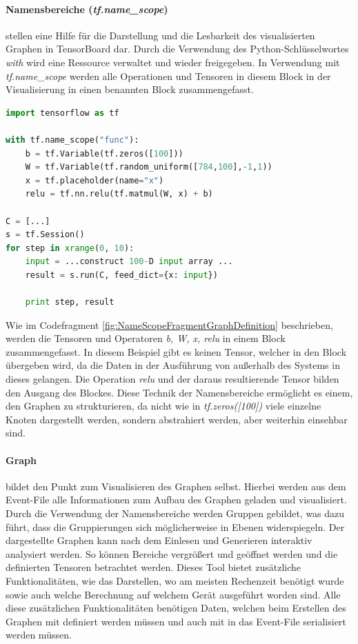 \paragraph{Namensbereiche (\textit{tf.name\_scope})} stellen eine Hilfe für die Darstellung und die Lesbarkeit des visualisierten Graphen in TensorBoard dar. 
Durch die Verwendung des Python-Schlüsselwortes \textit{with} wird eine Ressource verwaltet und wieder freigegeben. 
In Verwendung mit \textit{tf.name\_scope} werden alle Operationen und Tensoren in diesem Block in der Visualisierung in einen benannten Block zusammengefasst.
\begin{lstlisting}[caption={TensorFlow Codefragment zur Namescope Verwendung in Graphen},label=fig:NameScopeFragmentGraphDefinition,captionpos=b,language=Python]
import tensorflow as tf

with tf.name_scope("func"):
	b = tf.Variable(tf.zeros([100])) 
	W = tf.Variable(tf.random_uniform([784,100],-1,1)) 
	x = tf.placeholder(name="x") 
	relu = tf.nn.relu(tf.matmul(W, x) + b) 

C = [...] 
s = tf.Session()
for step in xrange(0, 10):
	input = ...construct 100-D input array ... 
	result = s.run(C, feed_dict={x: input}) 

	print step, result 
\end{lstlisting}
Wie im Codefragment \ref{fig:NameScopeFragmentGraphDefinition} beschrieben, werden die Tensoren und Operatoren \textit{b, W, x, relu} in einem Block zusammengefasst. 
In diesem Beispiel gibt es keinen Tensor, welcher in den Block übergeben wird, da die Daten in der Ausführung von außerhalb des Systems in dieses gelangen. 
Die Operation \textit{relu} und der daraus resultierende Tensor bilden den Ausgang des Blockes. 
Diese Technik der Namensbereiche ermöglicht es einem, den Graphen zu strukturieren, da nicht wie in \textit{tf.zeros([100])} viele einzelne Knoten dargestellt werden, sondern abstrahiert werden, aber weiterhin einsehbar sind.

\paragraph{Graph} bildet den Punkt zum Visualisieren des Graphen selbst. 
Hierbei werden aus dem Event-File alle Informationen zum Aufbau des Graphen geladen und visualisiert. 
Durch die Verwendung der Namensbereiche werden Gruppen gebildet, was dazu führt, dass die Gruppierungen sich möglicherweise in Ebenen widerspiegeln. 
Der dargestellte Graphen kann nach dem Einlesen und Generieren interaktiv analysiert werden. 
So können Bereiche vergrößert und geöffnet werden und die definierten Tensoren betrachtet werden. 
Dieses Tool bietet zusätzliche Funktionalitäten, wie das Darstellen, wo am meisten Rechenzeit benötigt wurde sowie auch welche Berechnung auf welchem Gerät ausgeführt worden sind. 
Alle diese zusätzlichen Funktionalitäten benötigen Daten, welchen beim Erstellen des Graphen mit definiert werden müssen und auch mit in das Event-File serialisiert werden müssen. 

